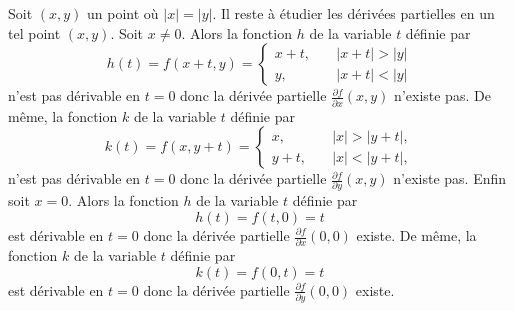 {{Soit  $(x,y)$ un point o\`u 
$\left|x\right| = \left|y\right|$.
Il reste \`a \'etudier les d\'eriv\'ees partielles en un tel point $(x,y)$.
Soit $x \ne 0$.
Alors la fonction $h$ de la variable $t$ d\'efinie par
\[
h(t)=f(x+t,y)=\begin{cases} x+t,\quad & |x+t|>|y|\\ y,\quad & |x+t|<|y| \end{cases}
\]
n'est pas d\'erivable en $t=0$ donc la d\'eriv\'ee partielle
$\frac{\partial f}{\partial x}(x,y)$ n'existe pas.
De m\^eme,
la fonction $k$ de la variable $t$ d\'efinie par
\[
k(t)=f(x,y+t)=\begin{cases} x,\quad & |x|>|y+t|,\\ y+t,\quad & |x|<|y+t|, \end{cases}
\]
n'est pas d\'erivable en $t=0$ donc la d\'eriv\'ee partielle
$\frac{\partial f}{\partial y}(x,y)$ n'existe pas.
Enfin soit $x = 0$.
Alors la fonction $h$ de la variable $t$ d\'efinie par
\[
h(t)=f(t,0)=t
\]
est d\'erivable en $t=0$ donc la d\'eriv\'ee partielle
$\frac{\partial f}{\partial x}(0,0)$ existe.
De m\^eme,
la fonction $k$ de la variable $t$ d\'efinie par
\[
k(t)=f(0,t)=t
\]
est d\'erivable en $t=0$ donc la d\'eriv\'ee partielle
$\frac{\partial f}{\partial y}(0,0)$ existe.}
}